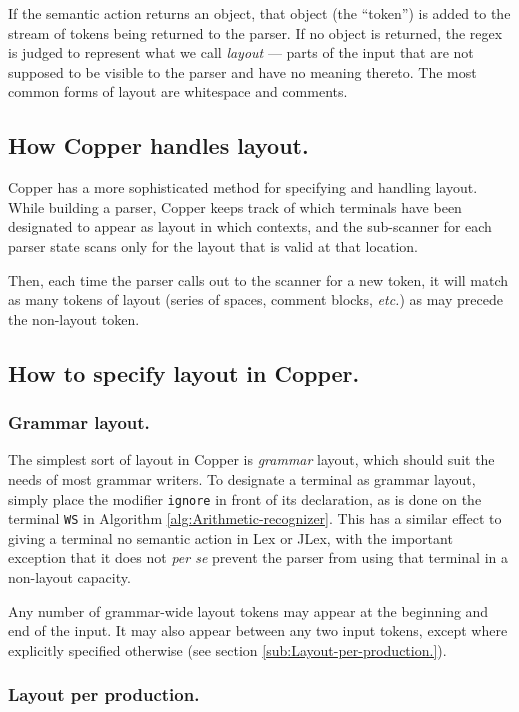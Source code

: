 \documentclass[12pt,english,twoside]{report}
\begin{document}
If the semantic action returns an object, that object (the {}``token'')
is added to the stream of tokens being returned to the parser. If
no object is returned, the regex is judged to represent what we call
\emph{layout} --- parts of the input that are not supposed to be visible
to the parser and have no meaning thereto. The most common forms of
layout are whitespace and comments.


\subsection{How Copper handles layout.}

Copper has a more sophisticated method for specifying and handling
layout. While building a parser, Copper keeps track of which terminals
have been designated to appear as layout in which contexts, and the
sub-scanner for each parser state scans only for the layout that is
valid at that location.

Then, each time the parser calls out to the scanner for a new token,
it will match as many tokens of layout (series of spaces, comment
blocks, \emph{etc.}) as may precede the non-layout token.

\subsection{How to specify layout in Copper.}


\subsubsection{Grammar layout.}

The simplest sort of layout in Copper is \emph{grammar} layout,
which should suit the needs of most grammar writers. To designate
a terminal as grammar layout, simply place the modifier \texttt{ignore}
in front of its declaration, as is done on the terminal \texttt{WS}
in Algorithm \ref{alg:Arithmetic-recognizer}. This has a similar
effect to giving a terminal no semantic action in Lex or JLex, with
the important exception that it does not \emph{per se} prevent the
parser from using that terminal in a non-layout capacity.

Any number of grammar-wide layout tokens may appear at the beginning
and end of the input. It may also appear between any two input tokens,
except where explicitly specified otherwise (see section \ref{sub:Layout-per-production.}).

\subsubsection{\label{sub:Layout-per-production.}Layout per production.}
\end{document}
